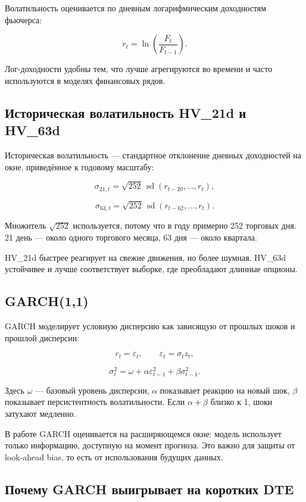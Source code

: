 \documentclass[11pt,a4paper]{article}
\begin{document}
Волатильность оценивается по дневным логарифмическим доходностям фьючерса:

\[
r_t=\ln\left(\frac{F_t}{F_{t-1}}\right).
\]

Лог-доходности удобны тем, что лучше агрегируются во времени и часто используются в моделях финансовых рядов.

\subsection{Историческая волатильность HV\_21d и HV\_63d}

Историческая волатильность --- стандартное отклонение дневных доходностей на окне, приведённое к годовому масштабу:

\[
\sigma_{21,t}=\sqrt{252}\,\operatorname{sd}(r_{t-20},\ldots,r_t),
\]

\[
\sigma_{63,t}=\sqrt{252}\,\operatorname{sd}(r_{t-62},\ldots,r_t).
\]

Множитель $\sqrt{252}$ используется, потому что в году примерно 252 торговых дня. 21 день --- около одного торгового месяца, 63 дня --- около квартала.

HV\_21d быстрее реагирует на свежие движения, но более шумная. HV\_63d устойчивее и лучше соответствует выборке, где преобладают длинные опционы.

\subsection{GARCH(1,1)}

GARCH моделирует условную дисперсию как зависящую от прошлых шоков и прошлой дисперсии:

\[
r_t=\varepsilon_t,\qquad \varepsilon_t=\sigma_t z_t,
\]

\[
\sigma_t^2=\omega+\alpha\varepsilon_{t-1}^2+\beta\sigma_{t-1}^2.
\]

Здесь $\omega$ --- базовый уровень дисперсии, $\alpha$ показывает реакцию на новый шок, $\beta$ показывает персистентность волатильности. Если $\alpha+\beta$ близко к 1, шоки затухают медленно.

В работе GARCH оценивается на расширяющемся окне: модель использует только информацию, доступную на момент прогноза. Это важно для защиты от look-ahead bias, то есть от использования будущих данных.

\subsection{Почему GARCH выигрывает на коротких DTE}
\end{document}
